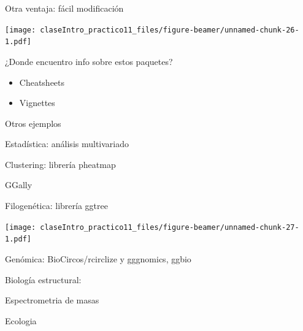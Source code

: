 \documentclass[ignorenonframetext,]{beamer}
\providecommand{\tightlist}{%
  \setlength{\itemsep}{0pt}\setlength{\parskip}{0pt}}
\begin{document}
\begin{frame}{Otra ventaja: fácil modificación}
\protect\hypertarget{otra-ventaja-fuxe1cil-modificaciuxf3n-1}{}

\texttt{[image: claseIntro\_practico11\_files/figure-beamer/unnamed-chunk-26-1.pdf]}

\end{frame}

\begin{frame}{¿Donde encuentro info sobre estos paquetes?}
\protect\hypertarget{donde-encuentro-info-sobre-estos-paquetes}{}

\begin{itemize}
\tightlist
\item
  Cheatsheets
\item
  Vignettes
\end{itemize}

\end{frame}

\begin{frame}{Otros ejemplos}
\protect\hypertarget{otros-ejemplos}{}

\end{frame}

\begin{frame}{Estadística: análisis multivariado}
\protect\hypertarget{estaduxedstica-anuxe1lisis-multivariado}{}

\end{frame}

\begin{frame}{Clustering: librería pheatmap}
\protect\hypertarget{clustering-libreruxeda-pheatmap}{}

\end{frame}

\begin{frame}{GGally}
\protect\hypertarget{ggally}{}

\end{frame}

\begin{frame}{Filogenética: librería ggtree}
\protect\hypertarget{filogenuxe9tica-libreruxeda-ggtree}{}

\texttt{[image: claseIntro\_practico11\_files/figure-beamer/unnamed-chunk-27-1.pdf]}

\end{frame}

\begin{frame}{Genómica: BioCircos/rcirclize y gggnomics, ggbio}
\protect\hypertarget{genuxf3mica-biocircosrcirclize-y-gggnomics-ggbio}{}

\end{frame}

\begin{frame}{Biología estructural:}
\protect\hypertarget{biologuxeda-estructural}{}

\end{frame}

\begin{frame}{Espectrometria de masas}
\protect\hypertarget{espectrometria-de-masas}{}

\end{frame}

\begin{frame}{Ecologia}
\protect\hypertarget{ecologia}{}

\end{frame}
\end{document}

